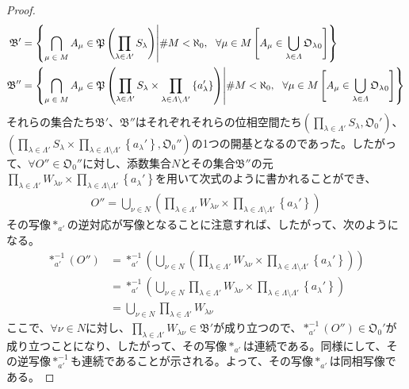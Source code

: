 \documentclass[dvipdfmx]{jsarticle}
\begin{document}
\begin{proof}
\begin{align*}
\mathfrak{B}' &= \left\{ \bigcap_{\scriptsize \begin{matrix}
\mu \in M \\
\end{matrix}} A_{\mu}\in \mathfrak{P}\left( \prod_{\lambda \in \varLambda'} S_{\lambda} \right) \middle| {\#}M < \aleph_{0},\ \ \forall\mu \in M\left[ A_{\mu} \in \bigcup_{\lambda \in \varLambda} {\mathfrak{O}_{\lambda}}_{0} \right] \right\}\\
\mathfrak{B}'' &= \left\{ \bigcap_{\scriptsize \begin{matrix}
\mu \in M \\
\end{matrix}} A_{\mu}\in \mathfrak{P}\left( \prod_{\lambda \in \varLambda'} S_{\lambda} \times \prod_{\lambda \in \varLambda \setminus \varLambda'} \left\{ a_{\lambda}' \right\} \right) \middle| {\#}M < \aleph_{0},\ \ \forall\mu \in M\left[ A_{\mu} \in \bigcup_{\lambda \in \varLambda} {\mathfrak{O}_{\lambda}}_{0} \right] \right\}
\end{align*}
それらの集合たち$\mathfrak{B}'$、$\mathfrak{B}''$はそれぞれそれらの位相空間たち$\left( \prod_{\lambda \in \varLambda'} S_{\lambda},\mathfrak{O}_{0}' \right)$、$\left( \prod_{\lambda \in \varLambda'} S_{\lambda} \times \prod_{\lambda \in \varLambda \setminus \varLambda'} \left\{ a_{\lambda}' \right\},\mathfrak{O}_{0}'' \right)$の1つの開基となるのであった。したがって、$\forall O'' \in \mathfrak{O}_{0}''$に対し、添数集合$N$とその集合$\mathfrak{B}''$の元$\prod_{\lambda \in \varLambda'} W_{\lambda\nu} \times \prod_{\lambda \in \varLambda \setminus \varLambda'} \left\{ a_{\lambda}' \right\}$を用いて次式のように書かれることができ、
\begin{align*}
O'' = \bigcup_{\nu \in N} \left( \prod_{\lambda \in \varLambda'} W_{\lambda\nu} \times \prod_{\lambda \in \varLambda \setminus \varLambda'} \left\{ a_{\lambda}' \right\} \right)
\end{align*}
その写像$*_{a'}$の逆対応が写像となることに注意すれば、したがって、次のようになる。
\begin{align*}
*_{a'}^{- 1}\left( O'' \right) &= *_{a'}^{- 1}\left( \bigcup_{\nu \in N} \left( \prod_{\lambda \in \varLambda'} W_{\lambda\nu} \times \prod_{\lambda \in \varLambda \setminus \varLambda'} \left\{ a_{\lambda}' \right\} \right) \right)\\
&= *_{a'}^{- 1}\left( \bigcup_{\nu \in N} {\prod_{\lambda \in \varLambda'} W_{\lambda\nu}} \times \prod_{\lambda \in \varLambda \setminus \varLambda'} \left\{ a_{\lambda}' \right\} \right)\\
&= \bigcup_{\nu \in N} {\prod_{\lambda \in \varLambda'} W_{\lambda\nu}}
\end{align*}
ここで、$\forall\nu \in N$に対し、$\prod_{\lambda \in \varLambda'} W_{\lambda\nu} \in \mathfrak{B}'$が成り立つので、$*_{a'}^{- 1}\left( O'' \right) \in \mathfrak{O}_{0}'$が成り立つことになり、したがって、その写像$*_{a'}$は連続である。同様にして、その逆写像$*_{a'}^{- 1}$も連続であることが示される。よって、その写像$*_{a'}$は同相写像である。
\end{proof}
\end{document}
